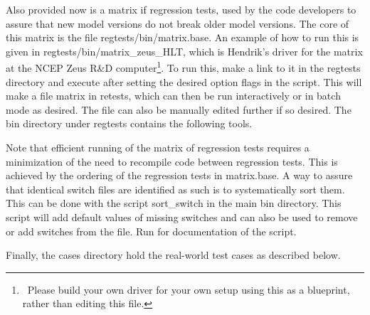 \noindent
Also provided now is a matrix if regression tests, used by the code developers
to assure that new model versions do not break older model versions. The core
of this matrix is the file {\file regtests/bin/matrix.base}. An example of how
to run this is given in {\file regtests/bin/matrix\_zeus\_HLT}, which is
Hendrik's driver for the matrix at the NCEP Zeus R\&D
computer\footnote{~Please build your own driver for your own setup using this
as a blueprint, rather than editing this file.}. To run this, make a link to
it in the {\file regtests} directory and execute after setting the desired
option flags in the script. This will make a file {\file matrix} in {\file
retests}, which can then be run interactively or in batch mode as desired. The
file can also be manually edited further if so desired. The {\file bin}
directory under {\file regtests} contains the following tools.

\begin{flist}
\end{flist}

\noindent 
Note that efficient running of the matrix of regression tests requires a
minimization of the need to recompile code between regression tests. This is
achieved by the ordering of the regression tests in {\file matrix.base}. A way
to assure that identical switch files are identified as such is to
systematically sort them. This can be done with the script {\file
sort\_switch} in the main {\file bin} directory. This script will add default
values of missing switches and can also be used to remove or add switches from
the file. Run  for documentation of the script.

\vspace{\baselineskip} \noindent 
Finally, the {\file cases} directory hold the real-world test cases as
described below.

\begin{flist}
\end{flist}

